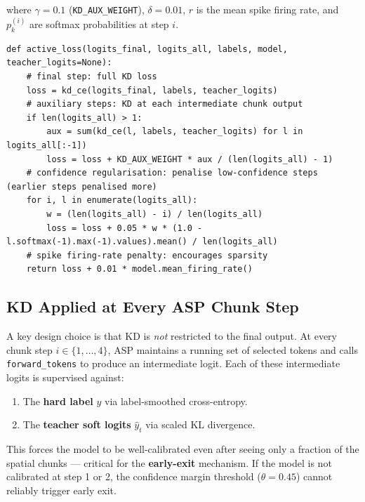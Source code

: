 \documentclass[11pt,a4paper]{article}
\begin{document}
where $\gamma = 0.1$ (\texttt{KD\_AUX\_WEIGHT}), $\delta = 0.01$, $r$ is the mean spike firing rate, and $p_k^{(i)}$ are softmax probabilities at step $i$.

\begin{lstlisting}[caption={ASP composite loss from \texttt{train\_a100.py} (lines 680--688).}]
def active_loss(logits_final, logits_all, labels, model, teacher_logits=None):
    # final step: full KD loss
    loss = kd_ce(logits_final, labels, teacher_logits)
    # auxiliary steps: KD at each intermediate chunk output
    if len(logits_all) > 1:
        aux = sum(kd_ce(l, labels, teacher_logits) for l in logits_all[:-1])
        loss = loss + KD_AUX_WEIGHT * aux / (len(logits_all) - 1)
    # confidence regularisation: penalise low-confidence steps (earlier steps penalised more)
    for i, l in enumerate(logits_all):
        w = (len(logits_all) - i) / len(logits_all)
        loss = loss + 0.05 * w * (1.0 - l.softmax(-1).max(-1).values).mean() / len(logits_all)
    # spike firing-rate penalty: encourages sparsity
    return loss + 0.01 * model.mean_firing_rate()
\end{lstlisting}

\subsection{KD Applied at Every ASP Chunk Step}

A key design choice is that KD is \emph{not} restricted to the final output. At every chunk step $i \in \{1,\ldots,4\}$, ASP maintains a running set of selected tokens and calls \texttt{forward\_tokens} to produce an intermediate logit. Each of these intermediate logits is supervised against:
\begin{enumerate}
  \item The \textbf{hard label} $y$ via label-smoothed cross-entropy.
  \item The \textbf{teacher soft logits} $\hat{y}_t$ via scaled KL divergence.
\end{enumerate}

This forces the model to be well-calibrated even after seeing only a fraction of the spatial chunks — critical for the \textbf{early-exit} mechanism. If the model is not calibrated at step 1 or 2, the confidence margin threshold ($\theta = 0.45$) cannot reliably trigger early exit.
\end{document}
